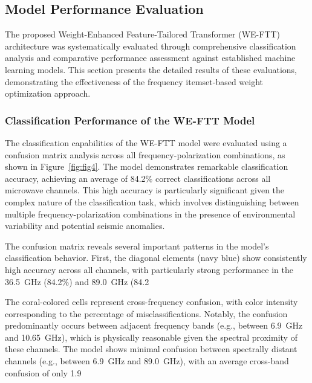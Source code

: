 \documentclass[preprint,review,12pt,authoryear]{elsarticle}
\begin{document}
\subsection{Model Performance Evaluation}
The proposed Weight-Enhanced Feature-Tailored Transformer (WE-FTT) architecture was systematically evaluated through comprehensive classification analysis and comparative performance assessment against established machine learning models. This section presents the detailed results of these evaluations, demonstrating the effectiveness of the frequency itemset-based weight optimization approach.

\subsubsection{Classification Performance of the WE-FTT Model}
The classification capabilities of the WE-FTT model were evaluated using a confusion matrix analysis across all frequency-polarization combinations, as shown in Figure~\ref{fig:fig4}. The model demonstrates remarkable classification accuracy, achieving an average of 84.2\% correct classifications across all microwave channels. This high accuracy is particularly significant given the complex nature of the classification task, which involves distinguishing between multiple frequency-polarization combinations in the presence of environmental variability and potential seismic anomalies.

The confusion matrix reveals several important patterns in the model's classification behavior. First, the diagonal elements (navy blue) show consistently high accuracy across all channels, with particularly strong performance in the 36.5~GHz (84.2\%) and 89.0~GHz (84.2%

The coral-colored cells represent cross-frequency confusion, with color intensity corresponding to the percentage of misclassifications. Notably, the confusion predominantly occurs between adjacent frequency bands (e.g., between 6.9~GHz and 10.65~GHz), which is physically reasonable given the spectral proximity of these channels. The model shows minimal confusion between spectrally distant channels (e.g., between 6.9~GHz and 89.0~GHz), with an average cross-band confusion of only 1.9%
\end{document}
